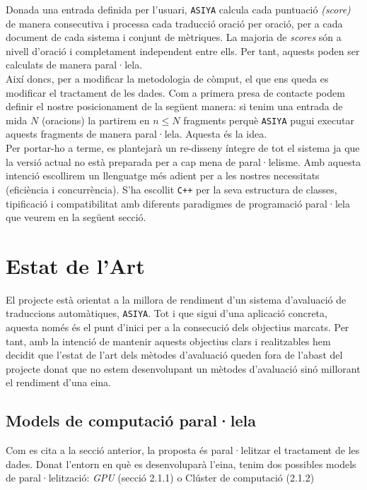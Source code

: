 \documentclass[11pt,a4paper]{article}
\begin{document}
Donada una entrada definida per l'usuari, \texttt{ASIYA} calcula cada puntuació \textit{(score)} de manera consecutiva i processa cada traducció oració per oració, per a cada document de cada sistema i conjunt de mètriques. La majoria de \emph{scores} són a nivell d'oració i completament independent entre ells. Per tant, aquests poden ser calculats de manera paral·lela.
\\

Així doncs, per a modificar la metodologia de còmput, el que ens queda es modificar el tractament de les dades. Com a primera presa de contacte podem definir el nostre posicionament de la següent manera: si tenim una entrada de mida $N$ (oracions) la partirem en $n \leqslant N$ fragments perquè \texttt{ASIYA} pugui executar aquests fragments de manera paral·lela. Aquesta és la idea.
\\

Per portar-ho a terme, es plantejarà un re-disseny íntegre de tot el sistema ja que la versió actual no està preparada per a cap mena de paral·lelisme. Amb aquesta intenció escollirem un llenguatge més adient per a les nostres necessitats (eficiència i concurrència). S'ha escollit \texttt{C++} per la seva estructura de classes, tipificació i compatibilitat amb diferents paradigmes de programació paral·lela que veurem en la següent secció.
\\

\newpage
\section{Estat de l'Art}
El projecte està orientat a la millora de rendiment d'un sistema d'avaluació de traduccions automàtiques, \texttt{ASIYA}. Tot i que sigui d'una aplicació concreta, aquesta només és el punt d'inici per a la consecució dels objectius marcats. Per tant, amb la intenció de mantenir aquests objectius clars i realitzables hem decidit que l'estat de l'art dels mètodes d'avaluació queden fora de l'abast del projecte donat que no estem desenvolupant un mètodes d'avaluació sinó millorant el rendiment d'una eina.

\subsection{Models de computació paral·lela}
Com es cita a la secció anterior, la proposta és paral·lelitzar el tractament de les dades. Donat l'entorn en què es desenvoluparà l'eina, tenim dos possibles models de paral·lelització: \textit{GPU} (secció 2.1.1) o Clúster de computació (2.1.2)
\end{document}
